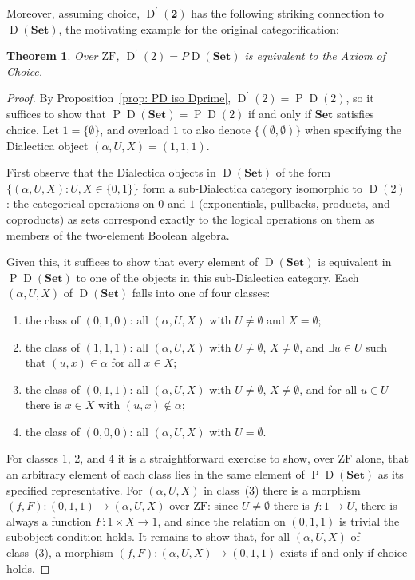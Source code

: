 \documentclass[reqno]{amsart}
\theoremstyle{plain}
\newtheorem{thm}{Theorem}
\theoremstyle{definition}
\newcommand{\Set}{\mathbf{Set}}
\DeclareMathOperator{\D}{D}
\DeclareMathOperator{\PR}{P}
\begin{document}
Moreover, assuming choice, $\D^{\prime}(\mathbf{2}) $ has the following striking connection to $\D (\Set) $, the motivating example for the original categorification:
\begin{thm}\label{PD(SET) = PD(2)}
    Over $\mathrm{ZF} $, $\D^{\prime}(2) = P \D(\Set) $ is equivalent to the Axiom of Choice.
\end{thm}
\begin{proof}
    By Proposition~\ref{prop: PD iso Dprime}, $ \D^{\prime}(2) = \PR\D(2) $, so it suffices to show that $ \PR\D(\Set) = \PR\D(2) $ if and only if $\Set$ satisfies choice. Let $1 = \{ \emptyset \} $, and overload $1$ to also denote $ \{ ( \emptyset, \emptyset) \} $ when specifying the Dialectica object $ (\alpha, U, X) = (1,1,1) $.

    First observe that the Dialectica objects in $ \D(\Set) $ of the form $ \{ (\alpha,U,X) : U,X \in \{0,1\} \} $ form a sub-Dialectica category isomorphic to $ \D(2) $: the categorical operations on $0$ and $1$ (exponentials, pullbacks, products, and coproducts) as sets correspond exactly to the logical operations on them as members of the two-element Boolean algebra.

    Given this, it suffices to show that every element of $ \D(\Set) $ is equivalent in $ \PR\D(\Set) $ to one of the objects in this sub-Dialectica category. Each $ (\alpha,U,X) $ of $ \D(\Set) $ falls into one of four classes:
    \begin{enumerate}
        \item the class of $ (0,1,0) $: all $ (\alpha,U,X) $ with $ U \neq \emptyset $ and $ X = \emptyset $;
        \item the class of $ (1,1,1) $: all $ (\alpha,U,X) $ with $ U \neq \emptyset $, $ X \neq \emptyset $, and $ \exists u \in U $ such that $ (u,x) \in \alpha $ for all $ x \in X $;
        \item the class of $ (0,1,1) $: all $ (\alpha, U, X) $ with $ U \neq \emptyset $, $ X \neq \emptyset $, and for all $ u \in U $ there is $ x \in X $ with $ (u,x) \notin \alpha $;
        \item the class of $ (0,0,0) $: all $ (\alpha, U, X) $ with $ U = \emptyset $.
    \end{enumerate}
    For classes 1, 2, and 4 it is a straightforward exercise to show, over $ \mathrm{ZF} $ alone, that an arbitrary element of each class lies in the same element of $ \PR\D(\Set) $ as its specified representative. For $ (\alpha, U, X) $ in class~(3) there is a morphism $ (f,F) \colon (0,1,1) \to (\alpha, U, X) $ over $ \mathrm{ZF} $: since $ U \neq \emptyset $ there is $ f \colon 1 \to U $, there is always a function $ F \colon 1 \times X \to 1 $, and since the relation on $ (0,1,1) $ is trivial the subobject condition holds. It remains to show that, for all $ (\alpha, U, X) $ of class~(3), a morphism $ (f, F) \colon (\alpha, U, X) \to (0,1,1) $ exists if and only if choice holds.


\end{proof}
\end{document}

